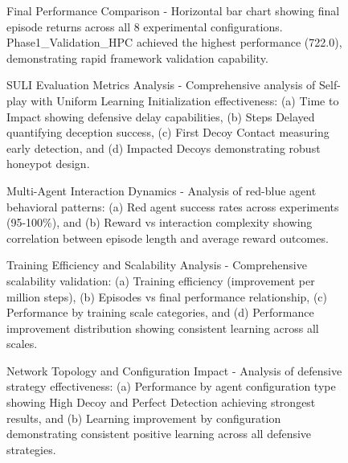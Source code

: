 \documentclass[11pt]{article}
\theoremstyle{definition}
\theoremstyle{plain}
\begin{document}
\begin{figure}[H]
\centering
\caption{Final Performance Comparison - Horizontal bar chart showing final episode returns across all 8 experimental configurations. Phase1\_Validation\_HPC achieved the highest performance (722.0), demonstrating rapid framework validation capability.}
\label{fig:performance_comparison}
\end{figure}

\begin{figure}[H]
\centering
\caption{SULI Evaluation Metrics Analysis - Comprehensive analysis of Self-play with Uniform Learning Initialization effectiveness: (a) Time to Impact showing defensive delay capabilities, (b) Steps Delayed quantifying deception success, (c) First Decoy Contact measuring early detection, and (d) Impacted Decoys demonstrating robust honeypot design.}
\label{fig:suli_evaluation}
\end{figure}

\begin{figure}[H]
\centering
\caption{Multi-Agent Interaction Dynamics - Analysis of red-blue agent behavioral patterns: (a) Red agent success rates across experiments (95-100\%), and (b) Reward vs interaction complexity showing correlation between episode length and average reward outcomes.}
\label{fig:interaction_dynamics}
\end{figure}

\begin{figure}[H]
\centering
\caption{Training Efficiency and Scalability Analysis - Comprehensive scalability validation: (a) Training efficiency (improvement per million steps), (b) Episodes vs final performance relationship, (c) Performance by training scale categories, and (d) Performance improvement distribution showing consistent learning across all scales.}
\label{fig:scalability_analysis}
\end{figure}

\begin{figure}[H]
\centering
\caption{Network Topology and Configuration Impact - Analysis of defensive strategy effectiveness: (a) Performance by agent configuration type showing High Decoy and Perfect Detection achieving strongest results, and (b) Learning improvement by configuration demonstrating consistent positive learning across all defensive strategies.}
\label{fig:topology_analysis}
\end{figure}
\end{document}
